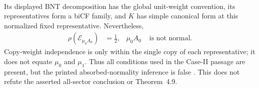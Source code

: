 \begin{lemma}
\begin{align}
    \end{align}
    Its displayed BNT decomposition has the global unit-weight convention,
    its representatives form a biCF family, and $K$ has simple canonical form
    at this normalized fixed representative. Nevertheless,
    \begin{align}
        \rho(\mathcal E_{\mu_0A_0}) & =\frac12,
                                    & \mu_0A_0  & \text{ is not normal}.                         \label{eq:caseii-absorbed-radius}
    \end{align}
    Copy-weight independence is only within the single copy of each
    representative; it does not equate $\mu_0$ and $\mu_1$. Thus all
    conditions used in the Case-II passage are present, but the printed
    absorbed-normality inference is false
    \cite[lines~1628--1665 and 1740--1782]{Cirac2016MPDO_arXiv}. This does not
    refute the asserted all-sector conclusion or Theorem~4.9.
\end{lemma}

